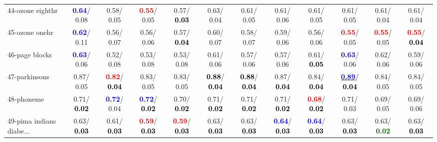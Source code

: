 \begin{table}[h]
\begin{center}
{\begin{tabular}{lc|c|c|c|c|c|c|c|c|c|c}
44-ozone eighthr & \textcolor{blue}{\textbf{  0.64}}/  0.08 &   0.58/  0.05 & \textcolor{red}{\textbf{  0.55}}/  0.05 &   0.57/\textcolor{black}{\textbf{  0.03}} &   0.63/  0.04 &   0.61/  0.05 &   0.61/  0.06 &   0.61/  0.05 &   0.61/  0.05 &   0.61/  0.04 &   0.61/  0.04 \\
45-ozone onehr & \textcolor{blue}{\textbf{  0.62}}/  0.11 &   0.56/  0.07 &   0.56/  0.06 &   0.57/\textcolor{black}{\textbf{  0.04}} &   0.60/  0.07 &   0.58/  0.07 &   0.59/  0.06 &   0.56/  0.06 & \textcolor{red}{\textbf{  0.55}}/  0.05 & \textcolor{red}{\textbf{  0.55}}/  0.05 & \textcolor{red}{\textbf{  0.55}}/\textcolor{black}{\textbf{  0.04}} \\
46-page blocks & \textcolor{blue}{\textbf{  0.63}}/  0.06 &   0.52/  0.08 &   0.53/  0.08 &   0.53/  0.08 &   0.61/  0.06 &   0.57/  0.06 &   0.57/  0.06 &   0.61/\textcolor{black}{\textbf{  0.05}} & \textcolor{blue}{\textbf{  0.63}}/  0.06 &   0.62/  0.06 &   0.59/  0.06 \\ \hline
47-parkinsons &   0.87/  0.05 & \textcolor{red}{\textbf{  0.82}}/\textcolor{black}{\textbf{  0.04}} &   0.83/  0.05 &   0.83/  0.05 & \textcolor{black}{\textbf{  0.88}}/\textcolor{black}{\textbf{  0.04}} & \textcolor{black}{\textbf{  0.88}}/\textcolor{black}{\textbf{  0.04}} &   0.87/\textcolor{black}{\textbf{  0.04}} &   0.84/\textcolor{black}{\textbf{  0.04}} & \underline{\textcolor{blue}{\textbf{  0.89}}}/\textcolor{black}{\textbf{  0.04}} &   0.84/  0.05 &   0.84/  0.05 \\
48-phoneme &   0.71/\textcolor{black}{\textbf{  0.02}} & \textcolor{blue}{\textbf{  0.72}}/  0.04 & \textcolor{blue}{\textbf{  0.72}}/\textcolor{black}{\textbf{  0.02}} &   0.70/\textcolor{black}{\textbf{  0.02}} &   0.71/\textcolor{black}{\textbf{  0.02}} &   0.71/\textcolor{black}{\textbf{  0.02}} &   0.71/\textcolor{black}{\textbf{  0.02}} & \textcolor{red}{\textbf{  0.68}}/\textcolor{black}{\textbf{  0.02}} &   0.71/  0.03 &   0.69/  0.05 &   0.69/  0.06 \\
49-pima indians diabe... &   0.63/\textcolor{black}{\textbf{  0.03}} &   0.61/\textcolor{black}{\textbf{  0.03}} & \textcolor{red}{\textbf{  0.59}}/\textcolor{black}{\textbf{  0.03}} & \textcolor{red}{\textbf{  0.59}}/\textcolor{black}{\textbf{  0.03}} &   0.63/\textcolor{black}{\textbf{  0.03}} &   0.63/\textcolor{black}{\textbf{  0.03}} & \textcolor{blue}{\textbf{  0.64}}/\textcolor{black}{\textbf{  0.03}} & \textcolor{blue}{\textbf{  0.64}}/\textcolor{black}{\textbf{  0.03}} &   0.63/\textcolor{black}{\textbf{  0.03}} &   0.63/\textcolor{darkgreen}{\textbf{  0.02}} &   0.63/\textcolor{black}{\textbf{  0.03}} \\

\end{tabular}}
\end{center}
\end{table}
